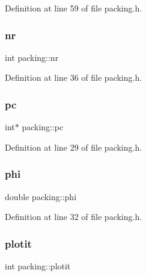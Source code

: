 Definition at line 59 of file packing.\+h.

\mbox{\label{classpacking_a31eede3d604c45fef6021170ee506c77}} 
\subsubsection{\texorpdfstring{nr}{nr}}
{\footnotesize\ttfamily int packing\+::nr\hspace{0.3cm}{\ttfamily [protected]}}



Definition at line 36 of file packing.\+h.

\mbox{\label{classpacking_abbc23675b258dfad02a53e578c1e4589}} 
\subsubsection{\texorpdfstring{pc}{pc}}
{\footnotesize\ttfamily int$\ast$ packing\+::pc\hspace{0.3cm}{\ttfamily [protected]}}



Definition at line 29 of file packing.\+h.

\mbox{\label{classpacking_a951a89b6ca12a40cb60344752bd8d817}} 
\subsubsection{\texorpdfstring{phi}{phi}}
{\footnotesize\ttfamily double packing\+::phi\hspace{0.3cm}{\ttfamily [protected]}}



Definition at line 32 of file packing.\+h.

\mbox{\label{classpacking_a495864a18a5eeef957d7a1bc3d3eb2bd}} 
\subsubsection{\texorpdfstring{plotit}{plotit}}
{\footnotesize\ttfamily int packing\+::plotit\hspace{0.3cm}{\ttfamily [protected]}}



